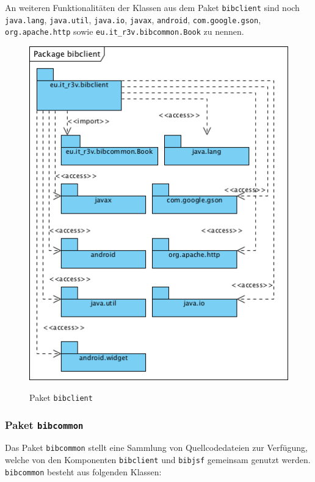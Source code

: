 \documentclass[fontsize=12pt,paper=a4,twoside]{scrartcl}
\begin{document}
\newpage

An weiteren Funktionalitäten der Klassen aus dem Paket \texttt{bibclient} sind noch \texttt{java.lang},
\texttt{java.util}, \texttt{java.io}, \texttt{javax}, \texttt{android}, \texttt{com.google.gson}, \texttt{org.apache.http} sowie \texttt{eu.it\_r3v.bibcommon.Book} zu nennen.

\begin{figure} [H] 
\caption{Paket \texttt{bibclient}} \centering
	\includegraphics[scale=2]{Diagramme/Packagebibclient.png} 
	\label{pic:PackageClient} 
\end{figure}


\subsubsection{Paket \texttt{bibcommon}}
\label{sec:bibcommon}

Das Paket \texttt{bibcommon} stellt eine Sammlung von Quellcodedateien zur Verfügung, welche von den Komponenten \texttt{bibclient} und \texttt{bibjsf} gemeinsam genutzt werden. \texttt{bibcommon} besteht aus folgenden Klassen:
\end{document}
